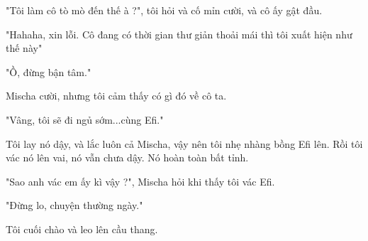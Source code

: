 "Tôi làm cô tò mò đến thế à ?", tôi hỏi và cố mỉn cười, và cô ấy gật đầu.

"Hahaha, xin lỗi. Cô đang có thời gian thư giản thoải mái thì tôi xuất hiện như thế này"

"Ồ, đừng bận tâm."

Mischa cười, nhưng tôi cảm thấy có gì đó về cô ta.

"Vâng, tôi sẽ đi ngủ sớm...cùng Efi."

Tôi lay nó dậy, và lắc luôn cả Mischa, vậy nên tôi nhẹ nhàng bồng Efi lên. Rồi tôi vác nó lên vai, nó vẫn chưa dậy. Nó hoàn toàn bất tỉnh.

"Sao anh vác em ấy kì vậy ?", Mischa hỏi khi thấy tôi vác Efi.

"Đừng lo, chuyện thường ngày."

Tôi cuối chào và leo lên cầu thang.\\









